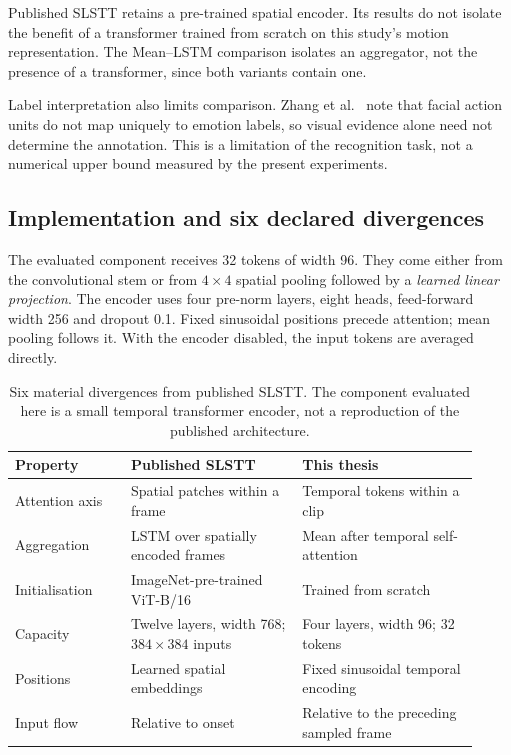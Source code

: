 Published SLSTT retains a pre-trained spatial encoder. Its results do not isolate the benefit of a transformer trained from scratch on this study's motion representation. The Mean--LSTM comparison isolates an aggregator, not the presence of a transformer, since both variants contain one.

Label interpretation also limits comparison. Zhang et al.~\cite{zhang2022} note that facial action units do not map uniquely to emotion labels, so visual evidence alone need not determine the annotation. This is a limitation of the recognition task, not a numerical upper bound measured by the present experiments.

\subsection{Implementation and six declared divergences}
\label{sec:transformer-implications}

The evaluated component receives 32 tokens of width 96. They come either from the convolutional stem or from $4\times4$ spatial pooling followed by a \emph{learned linear projection}. The encoder uses four pre-norm layers, eight heads, feed-forward width 256 and dropout 0.1. Fixed sinusoidal positions precede attention; mean pooling follows it. With the encoder disabled, the input tokens are averaged directly.

\begin{table}[htbp]
    \centering
    \small
    \begin{tabular}{@{}p{0.23\linewidth} p{0.34\linewidth} p{0.35\linewidth}@{}}
        \hline
        \textbf{Property} & \textbf{Published SLSTT~\cite{zhang2022}} & \textbf{This thesis} \\
        \hline
        Attention axis & Spatial patches within a frame & Temporal tokens within a clip \\
        Aggregation & LSTM over spatially encoded frames & Mean after temporal self-attention \\
        Initialisation & ImageNet-pre-trained ViT-B/16 & Trained from scratch \\
        Capacity & Twelve layers, width 768; $384\times384$ inputs & Four layers, width 96; 32 tokens \\
        Positions & Learned spatial embeddings & Fixed sinusoidal temporal encoding \\
        Input flow & Relative to onset & Relative to the preceding sampled frame \\
        \hline
    \end{tabular}
    \caption[Divergences from published SLSTT]{Six material divergences from published SLSTT. The component evaluated here is a small temporal transformer encoder, not a reproduction of the published architecture.}
    \label{tab:slstt-divergences}
\end{table}

